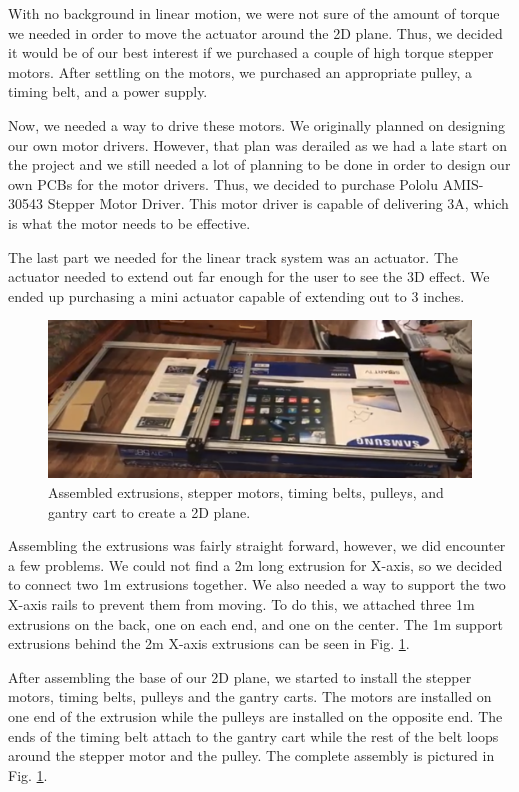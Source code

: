 \documentclass[11pt]{IEEEtran}
\begin{document}
With no background in linear motion, we were not sure of the amount of torque we needed in order to move the actuator around the 2D plane. Thus, we decided it would be of our best interest if we purchased a couple of high torque stepper motors. After settling on the motors, we purchased an appropriate pulley, a timing belt, and a power supply.

Now, we needed a way to drive these motors. We originally planned on designing our own motor drivers. However, that plan was derailed as we had a late start on the project and we still needed a lot of planning to be done in order to design our own PCBs for the motor drivers. Thus, we decided to purchase Pololu AMIS-30543 Stepper Motor Driver. This motor driver is capable of delivering 3A, which is what the motor needs to be effective. 

The last part we needed for the linear track system was an actuator. The actuator needed to extend out far enough for the user to see the 3D effect. We ended up purchasing a mini actuator capable of extending out to 3 inches.

\begin{figure}[H]
  \centering
  \includegraphics[width=\columnwidth]{image2.png}
  \caption{Assembled extrusions, stepper motors, timing belts, pulleys, and gantry cart to create a 2D plane.}
  \label{fig:lineartracks}
\end{figure}

Assembling the extrusions was fairly straight forward, however, we did encounter a few problems. We could not find a 2m long extrusion for X-axis, so we decided to connect two 1m extrusions together. We also needed a way to support the two X-axis rails to prevent them from moving. To do this, we attached three 1m extrusions on the back, one on each end, and one on the center. The 1m support extrusions behind the 2m X-axis extrusions can be seen in Fig. \ref{fig:lineartracks}.

After assembling the base of our 2D plane, we started to install the stepper motors, timing belts, pulleys and the gantry carts. The motors are installed on one end of the extrusion while the pulleys are installed on the opposite end. The ends of the timing belt attach to the gantry cart while the rest of the belt loops around the stepper motor and the pulley. The complete assembly is pictured in Fig. \ref{fig:lineartracks}.
\end{document}

